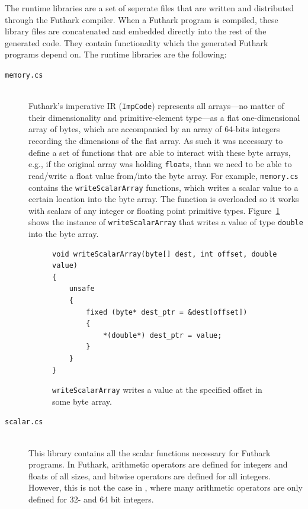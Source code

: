 The runtime libraries are a set of seperate \csharp{} files that are written and
distributed through the Futhark compiler. When a Futhark program is compiled,
these library files are concatenated and embedded directly into the rest of the
generated code. They contain functionality which the generated Futhark programs
depend on.
The runtime libraries are the following:
\begin{description}
\item[\texttt{memory.cs}] \hfill\\
  Futhark's imperative IR ({\tt ImpCode}) represents all arrays---no matter of 
    their dimensionality and primitive-element type---as a flat one-dimensional 
    array of bytes, which are accompanied by an array of 64-bits integers 
    recording the dimensions of the flat array.  As such it was necessary to 
    define a set of functions that are able to interact with these byte arrays,
    e.g., if the original array was holding {\tt float}s, than we need to be
    able to read/write a float value from/into the byte array. 
  For example, \texttt{memory.cs} contains the \texttt{writeScalarArray} functions,
  which writes a scalar value to a certain location into the byte array. The 
    function is overloaded so it works with scalars of any integer or floating 
    point primitive types. Figure~\ref{fig:writeScalarArray} shows the instance
    of {\tt writeScalarArray} that writes a value of type {\tt double} into the
    byte array.
\begin{figure}[h]
\centering
\begin{verbatim}
void writeScalarArray(byte[] dest, int offset, double value)
{
    unsafe
    {
        fixed (byte* dest_ptr = &dest[offset])
        {
            *(double*) dest_ptr = value;
        }
    }
}
\end{verbatim}
\caption{\texttt{writeScalarArray} writes a value at the specified offset in
some byte array.}
\label{fig:writeScalarArray}
\end{figure}

\item[\texttt{scalar.cs}] \hfill\\
  This library contains all the scalar functions necessary for Futhark \csharp{}
  programs.
  In Futhark, arithmetic operators are defined for integers and floats of all
  sizes, and bitwise operators are defined for all integers.
  However, this is not the case in \csharp{}, where many arithmetic operators
  are only defined for 32- and 64 bit integers.
  

\end{description}

